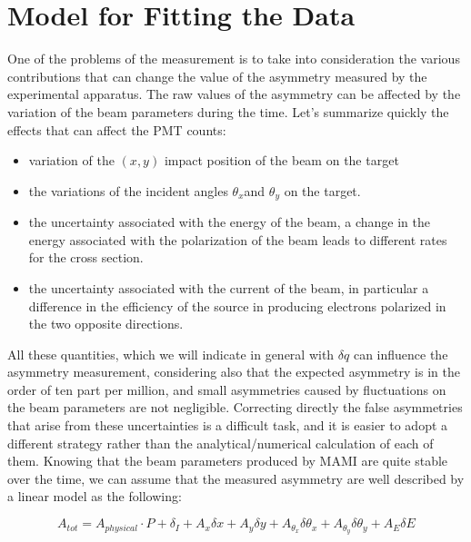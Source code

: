 \section{Model for Fitting the Data} \label{Model}

One of the problems of the measurement is to take into consideration the various contributions that can change the value of the asymmetry measured by the experimental apparatus. The raw values of the asymmetry can be affected by the variation of the beam parameters during the time. Let's summarize quickly the effects that can affect the PMT counts:
\begin{itemize}
\item variation of the $(x,y)$ impact position of the beam on the target
\item the variations of the incident angles $\theta_{x}$and $\theta_{y}$ on the target.
\item the uncertainty associated with the energy of the beam, a change in the energy associated with the polarization of the beam leads to different rates for the cross section.
\item the uncertainty associated with the current of the beam, in particular a difference in the 
efficiency of the source in producing electrons polarized in the two opposite directions.
\end{itemize}

All these quantities, which we will indicate in general with $\delta q$ can influence the asymmetry measurement, considering also that the expected asymmetry is in the order of ten part per million, and small asymmetries caused by fluctuations on the beam parameters are not negligible. Correcting directly the false asymmetries that arise from these uncertainties is a difficult task, and it is easier to adopt a different strategy rather than the analytical/numerical calculation of each of them. Knowing that the beam parameters produced by MAMI are quite stable over the time, we can assume that the measured asymmetry are well described by a linear model as the following:

\begin{equation}
A_{tot} = A_{physical} \cdot P + \delta_{I} + A_{x} \delta x + A_{y} \delta y + A_{\theta_{x}} \delta \theta_{x} + A_{\theta_{y}} \delta \theta_{y}+ A_{E} \delta E 
\end{equation}

